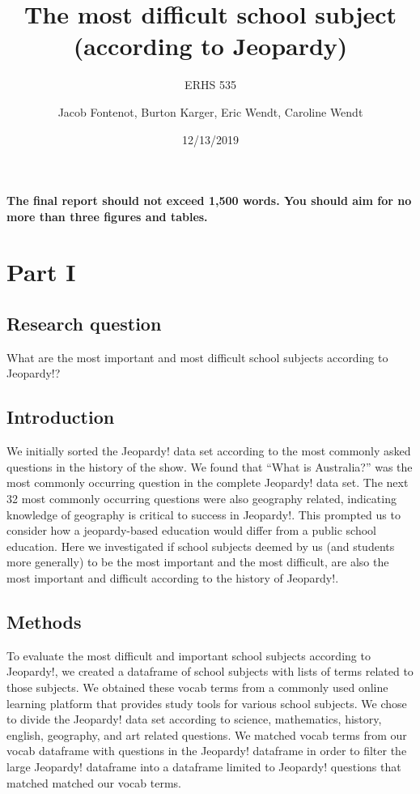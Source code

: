 \documentclass[]{article}
\title{The most difficult school subject\\
(according to Jeopardy)}
\subtitle{ERHS 535}
\author{Jacob Fontenot, Burton Karger, Eric Wendt, Caroline Wendt}
\date{12/13/2019}
\begin{document}
\maketitle

\textbf{The final report should not exceed 1,500 words. You should aim
for no more than three figures and tables.}

\hypertarget{part-i}{%
\section{Part I}\label{part-i}}

\hypertarget{research-question}{%
\subsection{Research question}\label{research-question}}

What are the most important and most difficult school subjects according
to Jeopardy!?

\hypertarget{introduction}{%
\subsection{Introduction}\label{introduction}}

We initially sorted the Jeopardy! data set according to the most
commonly asked questions in the history of the show. We found that
``What is Australia?'' was the most commonly occurring question in the
complete Jeopardy! data set. The next 32 most commonly occurring
questions were also geography related, indicating knowledge of geography
is critical to success in Jeopardy!. This prompted us to consider how a
jeopardy-based education would differ from a public school education.
Here we investigated if school subjects deemed by us (and students more
generally) to be the most important and the most difficult, are also the
most important and difficult according to the history of Jeopardy!.

\hypertarget{methods}{%
\subsection{Methods}\label{methods}}

To evaluate the most difficult and important school subjects according
to Jeopardy!, we created a dataframe of school subjects with lists of
terms related to those subjects. We obtained these vocab terms from a
commonly used online learning platform that provides study tools for
various school subjects. We chose to divide the Jeopardy! data set
according to science, mathematics, history, english, geography, and art
related questions. We matched vocab terms from our vocab dataframe with
questions in the Jeopardy! dataframe in order to filter the large
Jeopardy! dataframe into a dataframe limited to Jeopardy! questions that
matched matched our vocab terms.
\end{document}
